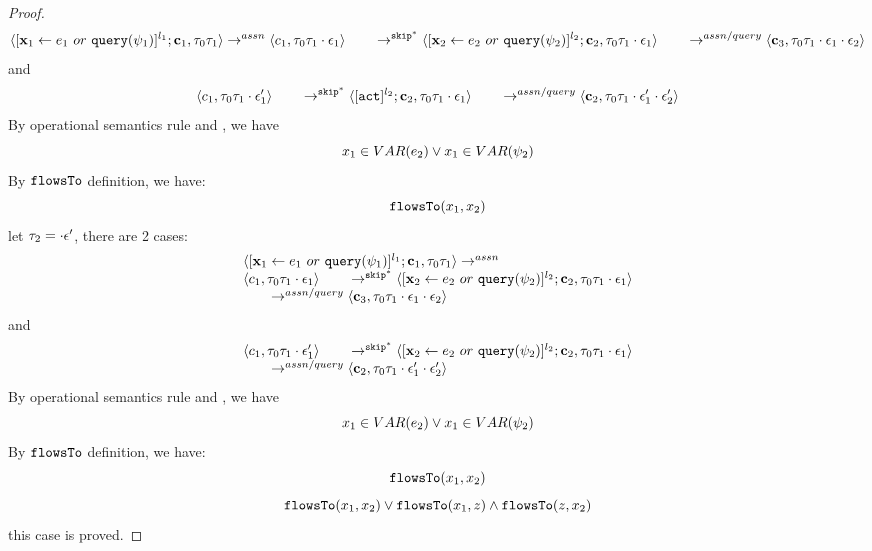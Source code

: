 \documentclass[a4paper,11pt]{article}
\begin{document}
\begin{proof}
\[
	\langle [\mathrel{ {\boldsymbol{\mathbf{x}}}_1 \leftarrow e_1~ or ~ {\tt query}(\psi_1) }]^{l_1} ; {\boldsymbol{\mathbf{c}}}_1, \mathtt{\tau}_0 \mathtt{\tau}_1 \rangle  \rightarrow^{assn}
\\ 
 \langle c_1, \mathtt{\tau}_0 \mathtt{\tau}_1 \cdot \mathtt{\epsilon}_1 \rangle 
  \qquad \rightarrow^{\mathtt{skip}^*} 
  \langle [\mathrel{ {\boldsymbol{\mathbf{x}}}_2 \leftarrow e_2 ~ or ~ {\tt query}(\psi_2) }]^{l_2};{\boldsymbol{\mathbf{c}}}_2, 
  \mathtt{\tau}_0 \mathtt{\tau}_1 \cdot \mathtt{\epsilon}_1 \rangle 
  \\
  \qquad \rightarrow^{assn/query} 
  \langle {\boldsymbol{\mathbf{c}}}_3,  \mathtt{\tau}_0 \mathtt{\tau}_1 \cdot \mathtt{\epsilon}_1\cdot \mathtt{\epsilon}_2 \rangle 
\]
and
\[
	 \langle c_1, \mathtt{\tau}_0 \mathtt{\tau}_1 \cdot \mathtt{\epsilon}_1' \rangle 
  \qquad \rightarrow^{\mathtt{skip}^*} 
  \langle [\mathtt{act}]^{l_2} ; {\boldsymbol{\mathbf{c}}}_2, \mathtt{\tau}_0 \mathtt{\tau}_1 \cdot \mathtt{\epsilon}_1 \rangle 
  \\
  \qquad \rightarrow^{assn/query} 
  \langle {\boldsymbol{\mathbf{c}}}_2,  \mathtt{\tau}_0 \mathtt{\tau}_1 \cdot \mathtt{\epsilon}_1' \cdot \mathtt{\epsilon}_2' \rangle 
\]
By operational semantics rule  and , we have 
\[
	x_1 \in VAR(e_2) \lor x_1 \in VAR(\psi_2)
\]
By $\mathtt{flowsTo}$ definition, we have:
\[
\mathtt{flowsTo}(x_1, x_2)
\]
%
 let $\mathtt{\tau}_2 = \cdot \mathtt{\epsilon}'$, there are 2 cases:
\[
\begin{array}{l}
	\langle [\mathrel{ {\boldsymbol{\mathbf{x}}}_1 \leftarrow e_1~ or ~ {\tt query}(\psi_1) }]^{l_1} ; {\boldsymbol{\mathbf{c}}}_1, \mathtt{\tau}_0 \mathtt{\tau}_1 \rangle  \rightarrow^{assn}
\\ 
 \langle c_1, \mathtt{\tau}_0 \mathtt{\tau}_1 \cdot \mathtt{\epsilon}_1 \rangle 
  \qquad \rightarrow^{\mathtt{skip}^*} 
  \langle [\mathrel{ {\boldsymbol{\mathbf{x}}}_2 \leftarrow e_2 ~ or ~ {\tt query}(\psi_2) }]^{l_2};{\boldsymbol{\mathbf{c}}}_2, 
  \mathtt{\tau}_0 \mathtt{\tau}_1 \cdot \mathtt{\epsilon}_1 \rangle 
  \\
  \qquad \rightarrow^{assn/query} 
  \langle {\boldsymbol{\mathbf{c}}}_3,  \mathtt{\tau}_0 \mathtt{\tau}_1 \cdot \mathtt{\epsilon}_1\cdot \mathtt{\epsilon}_2 \rangle 
\end{array}
\]
and
\[
\begin{array}{l}
\langle c_1, \mathtt{\tau}_0 \mathtt{\tau}_1 \cdot \mathtt{\epsilon}_1' \rangle 
  \qquad \rightarrow^{\mathtt{skip}^*} 
  \langle [\mathrel{ {\boldsymbol{\mathbf{x}}}_2 \leftarrow e_2 ~ or ~ {\tt query}(\psi_2) }]^{l_2} ; {\boldsymbol{\mathbf{c}}}_2, \mathtt{\tau}_0 \mathtt{\tau}_1 \cdot \mathtt{\epsilon}_1 \rangle 
  \\
  \qquad \rightarrow^{assn/query} 
  \langle {\boldsymbol{\mathbf{c}}}_2,  \mathtt{\tau}_0 \mathtt{\tau}_1 \cdot \mathtt{\epsilon}_1' \cdot \mathtt{\epsilon}_2' \rangle
\end{array} 
\]
By operational semantics rule  and , we have 
\[
	x_1 \in VAR(e_2) \lor x_1 \in VAR(\psi_2)
\]
By $\mathtt{flowsTo}$ definition, we have:
\[
\mathtt{flowsTo}(x_1, x_2)
\]
\[
	\mathtt{flowsTo}(x_1, x_2) \lor \mathtt{flowsTo}(x_1, z) \land \mathtt{flowsTo}(z, x_2)
\]
this case is proved.


\end{proof}
\end{document}
